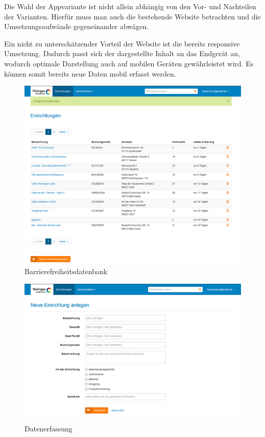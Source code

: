 Die Wahl der Appvariante ist nicht allein abhängig von den Vor- und Nachteilen der Varianten. Hierfür muss man auch die bestehende Website betrachten und die Umsetzungsaufwände gegeneinander abwägen.

Ein nicht zu unterschätzender Vorteil der Website ist die bereits responsive Umsetzung. Dadurch passt sich der dargestellte Inhalt an das Endgerät an, wodurch optimale Darstellung auch auf mobilen Geräten gewährleistet wird. Es können somit bereits neue Daten mobil erfasst werden.

\begin{figure}[htb]
	\includegraphics[width=\textwidth]{Bilder/Barrierefreidatenbank}
	\caption{Barrierefreiheitsdatenbank}
	\label{fig:system:Barrierefreidatenbank}
\end{figure}

\begin{figure}[htb]
	\includegraphics[width=\textwidth]{Bilder/Datenerfassung}
	\caption{Datenerfassung}
	\label{fig:system:Datenerfassung}
\end{figure}

